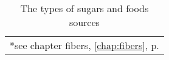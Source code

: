 \documentclass[../main.tex]{subfiles}
\begin{document}
\begin{table}[hb!]
\begin{tabularx}{\linewidth}{|p{3cm}|p{2.5cm}|p{3cm}|p{2.5cm}|}

    \bottomrule
    \multicolumn{4}{l}{\footnotesize{*see chapter fibers, \ref{chap:fibers}, p. \pageref{chap:fibers}}}
  \end{tabularx}
  \caption[Types of sugar and sources]{The types of sugars and foods sources}
\end{table}
\end{document}
